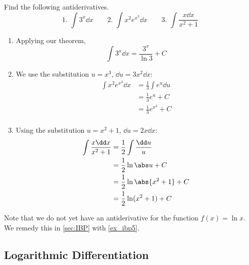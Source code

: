 \begin{example}\label{ex_exp_log_anti}
Find the following antiderivatives.
\[
 \text{1. }\int 3^x\dd x\qquad
 \text{2. }\int x^2 e^{x^3}\dd x\qquad
 \text{3. }\int \frac{x\dd x}{x^2+1}
\]
\solution
\begin{enumerate}
\item Applying our theorem,
\[\int 3^x\dd x=\frac{3^x}{\ln 3}+C\]
\item We use the substitution $u=x^3$, $\dd u=3x^2\dd x$:
\begin{align*}
\int x^2e^{x^3}\dd x &=\frac13 \int e^u\dd u\\
&=\frac 13 e^u+C\\
&=\frac 13 e^{x^3}+C\\
\end{align*}
\item Using the substitution $u=x^2+1$, $\dd u=2x\dd x$:
\begin{align*}
\int \frac{x\dd x}{x^2+1}&=\frac 12 \int \frac{\dd u}{u}\\
&=\frac 12 \ln\abs u+C\\
&=\frac 12 \ln\abs{x^2+1}+C\\
&=\frac 12 \ln(x^2+1)+C
\end{align*}
\end{enumerate}
\end{example}

Note that we do not yet have an antiderivative for the function $f(x)=\ln x$. We remedy this in \autoref{sec:IBP} with \autoref{ex_ibp5}.

%
%

\subsection{Logarithmic Differentiation}


